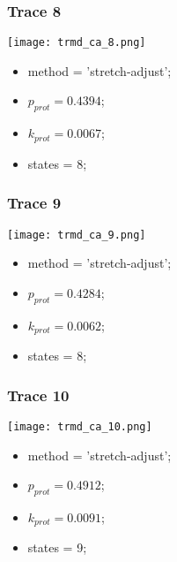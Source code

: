 \subsubsection{Trace 8}
\begin{minipage}[c]{0.7\textwidth}
    \texttt{[image: trmd\_ca\_8.png]}
\end{minipage}
\hfill
\begin{minipage}[c]{0.45\textwidth}
    \begin{itemize}
        \item method = 'stretch-adjust';
        \item $p_{prot}=0.4394$;
        \item $k_{prot}=0.0067$;
        \item states = 8;
    \end{itemize}
\end{minipage}

\subsubsection{Trace 9}
\begin{minipage}[c]{0.7\textwidth}
    \texttt{[image: trmd\_ca\_9.png]}
\end{minipage}
\hfill
\begin{minipage}[c]{0.45\textwidth}
    \begin{itemize}
        \item method = 'stretch-adjust';
        \item $p_{prot}=0.4284$;
        \item $k_{prot}=0.0062$;
        \item states = 8;
    \end{itemize}
\end{minipage}

\subsubsection{Trace 10}
\begin{minipage}[c]{0.7\textwidth}
    \texttt{[image: trmd\_ca\_10.png]}
\end{minipage}
\hfill
\begin{minipage}[c]{0.45\textwidth}
    \begin{itemize}
        \item method = 'stretch-adjust';
        \item $p_{prot}=0.4912$;
        \item $k_{prot}=0.0091$;
        \item states = 9;
    \end{itemize}
\end{minipage}


